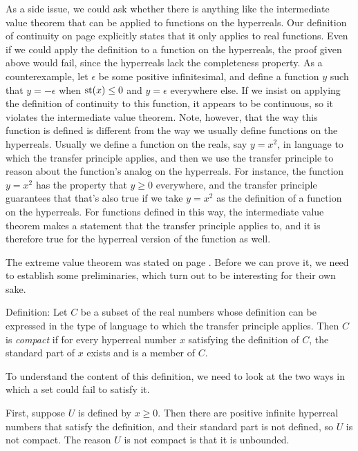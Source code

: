 As a side issue, we could ask whether there is anything like the intermediate value theorem
that can be applied to functions on the hyperreals. Our definition of continuity on page \pageref{def-continuity}
explicitly states that it only applies to real functions.
Even if we could apply the definition to a function on the hyperreals, the proof given above would fail, since the hyperreals lack the completeness
property. As a counterexample, let $\epsilon$ be some positive infinitesimal, and define
a function $y$ such that $y=-\epsilon$ when $\textup{st}(x) \le 0$ and $y=\epsilon$ everywhere else.
If we insist on applying the definition of continuity to this function, it appears to be continuous,
so it violates the intermediate value theorem. Note, however, that the way this function is defined
is different from the way we usually define functions on the hyperreals. Usually we define a function
on the reals, say $y=x^2$, in language to which the transfer principle applies, and then we use the
transfer principle to reason about the function's analog on the hyperreals. For instance, the function
$y=x^2$ has the property that $y \ge 0$ everywhere, and the transfer principle guarantees that that's
also true if we take $y=x^2$ as the definition of a function on the hyperreals. For functions defined
in this way, the intermediate value theorem makes a statement that the transfer principle applies
to, and it is therefore true for the hyperreal version of the function as well.


The extreme value theorem was stated on page \pageref{extreme-value-theorem}. Before we can prove
it, we need to establish some preliminaries, which turn out to be interesting for their own sake.

Definition: Let $C$ be a subset of the real numbers whose definition can be expressed
in the type of language to which the transfer principle applies. Then $C$ is \emph{compact}
if for every hyperreal number $x$ satisfying the definition of $C$, the standard part of $x$ exists
and is a member of $C$.

To understand the content of this definition, we need to look at the two ways in which a set could
fail to satisfy it. 

First, suppose $U$ is defined by $x \ge 0$. Then there are positive infinite
hyperreal numbers that satisfy the definition, and their standard part is not defined, so $U$ is not
compact. The reason $U$ is not compact is that it is unbounded.

